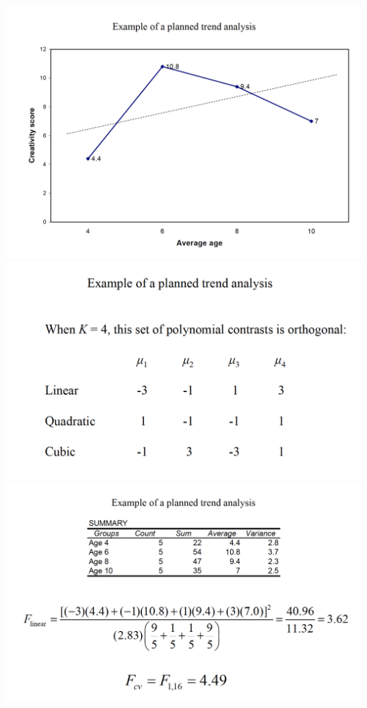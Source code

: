 \documentclass[]{book}
\theoremstyle{definition}
\theoremstyle{definition}
\theoremstyle{definition}
\theoremstyle{remark}
\begin{document}
\includegraphics{img/hicksphc22.png}
\includegraphics{img/hicksphc23.png}
\includegraphics{img/hicksphc24.png}
\end{document}
